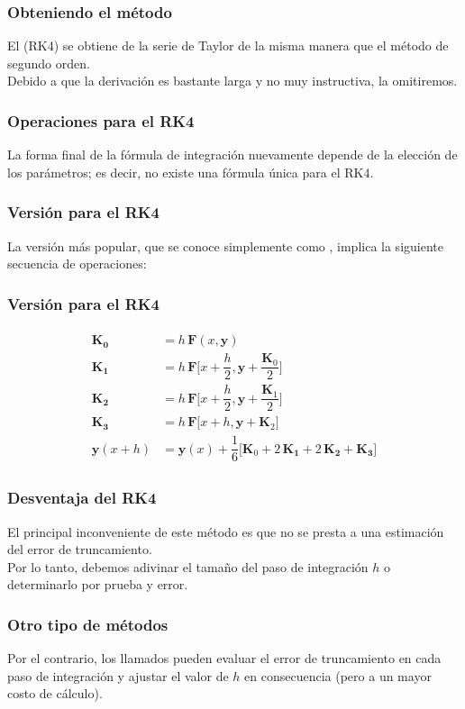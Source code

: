 \documentclass[12pt]{beamer}
\begin{document}
\begin{frame}
\frametitle{Obteniendo el método}
El  (RK4) se obtiene de la serie de Taylor de la misma manera que el método de segundo orden.
\\
\bigskip
\pause
Debido a que la derivación es bastante larga y no muy instructiva, la omitiremos.
\end{frame}
\begin{frame}
\frametitle{Operaciones para el RK4}
La forma final de la fórmula de integración nuevamente depende de la elección de los parámetros; \pause es decir, no existe una fórmula única para el RK4.
\end{frame}
\begin{frame}
\frametitle{Versión para el RK4}
La versión más popular, que se conoce simplemente como , implica la siguiente secuencia de operaciones:
\end{frame}
\begin{frame}
\frametitle{Versión para el RK4}
\begin{align}
\begin{aligned}
\mathbf{K_{0}} &= h \, \mathbf{F} (x, \mathbf{y}) \\
\mathbf{K_{1}} &= h \, \mathbf{F} \bigg[x + \dfrac{h}{2}, \mathbf{y} + \dfrac{\mathbf{K}_{0}}{2} \bigg] \\
\mathbf{K_{2}} &= h \, \mathbf{F} \bigg[x + \dfrac{h}{2}, \mathbf{y} + \dfrac{\mathbf{K}_{1}}{2} \bigg] \\
\mathbf{K_{3}} &= h \, \mathbf{F} \big[x + h, \mathbf{y} + \mathbf{K}_{2} \big] \\
\mathbf{y} (x + h) &= \mathbf{y} (x) + \dfrac{1}{6} \bigg[ \mathbf{K}_{0} + 2 \, \mathbf{K_{1}} + 2 \, \mathbf{K_{2}} + \mathbf{K_{3}} \bigg]
\end{aligned}
\label{eq:ecuacion_07_10}
\end{align}
\end{frame}
\begin{frame}
\frametitle{Desventaja del RK4}
El principal inconveniente de este método es que no se presta a una estimación del error de truncamiento.
\\
\bigskip
\pause
Por lo tanto, debemos adivinar el tamaño del paso de integración $h$ o determinarlo por prueba y error.
\end{frame}
\begin{frame}
\frametitle{Otro tipo de métodos}
Por el contrario, los llamados  pueden evaluar el error de truncamiento en cada paso de integración y ajustar el valor de $h$ en consecuencia (pero a un mayor costo de cálculo).
\end{frame}
\end{document}

